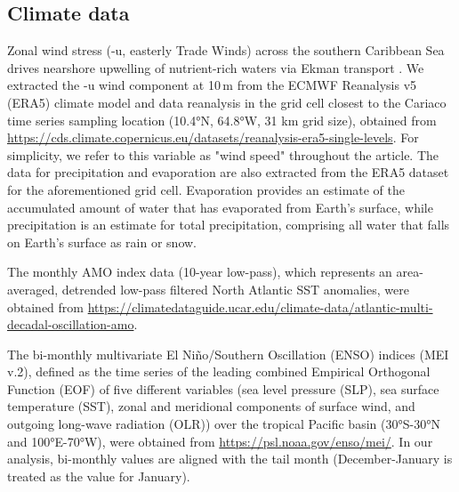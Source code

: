 \documentclass[draft]{agujournal2019}
\begin{document}
\subsection{Climate data}
    Zonal wind stress (-u, easterly Trade Winds) across the southern Caribbean Sea drives nearshore upwelling of nutrient-rich waters via Ekman transport \cite{rueda-roa_southern_2013}. We extracted the -u wind component at 10\,m from the ECMWF Reanalysis v5 (ERA5) climate model and data reanalysis in the grid cell closest to the Cariaco time series sampling location (\ang{10.4}N, \ang{64.8}W, 31 km grid size), obtained from \url{https://cds.climate.copernicus.eu/datasets/reanalysis-era5-single-levels}. For simplicity, we refer to this variable as "wind speed" throughout the article. The data for precipitation and evaporation are also extracted from the ERA5 dataset for the aforementioned grid cell. Evaporation provides an estimate of the accumulated amount of water that has evaporated from Earth's surface, while precipitation is an estimate for total precipitation, comprising all water that falls on Earth's surface as rain or snow. 
    
    The monthly AMO index data (10-year low-pass), which represents an area-averaged, detrended low-pass filtered North Atlantic SST anomalies, were obtained from \url{https://climatedataguide.ucar.edu/climate-data/atlantic-multi-decadal-oscillation-amo}. 
    
    The bi-monthly multivariate El Niño/Southern Oscillation (ENSO) indices (MEI v.2), defined as the time series of the leading combined Empirical Orthogonal Function (EOF) of five different variables (sea level pressure (SLP), sea surface temperature (SST), zonal and meridional components of surface wind, and outgoing long-wave radiation (OLR)) over the tropical Pacific basin (\ang{30}S-\ang{30}N and \ang{100}E-\ang{70}W), were obtained from \url{https://psl.noaa.gov/enso/mei/}. In our analysis, bi-monthly values are aligned with the tail month (December-January is treated as the value for January).
    
\end{document}

